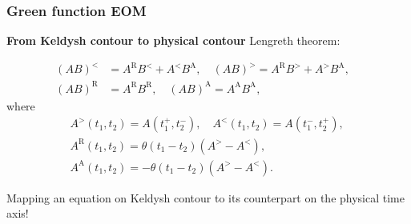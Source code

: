 \documentclass[t]{beamer}
\begin{document}
\begin{frame}
\frametitle{Green function EOM}

\textbf{From Keldysh contour to physical contour} Lengreth theorem: 

\begin{equation}
    \begin{aligned}
        (AB)^< &= A^{\text{R}} B^< + A^< B^{\text{A}}, \quad 
        (AB)^> = A^{\text{R}} B^> + A^> B^{\text{A}}, \quad \\
        (AB)^{\text{R}} &= A^{\text{R}} B^{\text{R}}, \quad 
        (AB)^{\text{A}} = A^{\text{A}} B^{\text{A}},
    \end{aligned}
\end{equation}
where
\begin{equation}
    \begin{aligned}
        &A^>(t_1, t_2) = A(t_1^+, t_2^-), \quad 
        A^<(t_1, t_2) = A(t_1^-, t_2^+), \quad \\
        &A^{\text{R}}(t_1, t_2) = \theta(t_1 - t_2) (A^> - A^<), \quad \\
        &A^{\text{A}}(t_1, t_2) = - \theta(t_1 - t_2) (A^> - A^<).
    \end{aligned}
\end{equation}

Mapping an equation on Keldysh contour to its counterpart on the physical time axis!


\end{frame}
\end{document}
